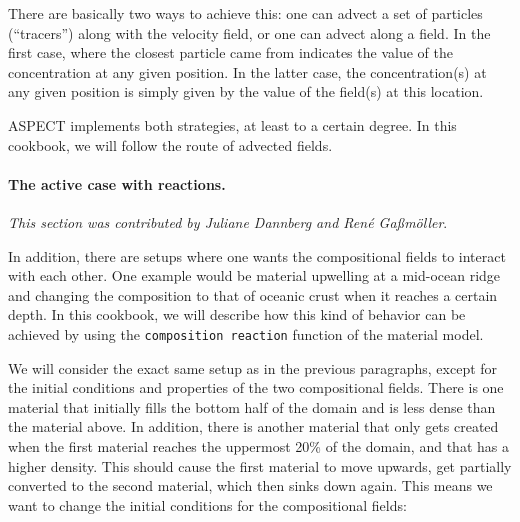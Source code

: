 \documentclass{article}
\newcommand{\aspect}{\textsc{ASPECT}}
\begin{document}
There are basically two ways to achieve this: one can advect a set of
particles (``tracers'') along with the velocity field, or one can advect along a
field. In the first case, where the closest particle came from indicates the
value of the concentration at any given position. In the latter case, the
concentration(s) at any given position is simply given by the value of the
field(s) at this location.

\aspect{} implements both strategies, at least to a certain degree. In this
cookbook, we will follow the route of advected fields.










\paragraph{The active case with reactions.}

\textit{This section was contributed by Juliane Dannberg and Ren{\'e} Ga{\ss}m{\"o}ller}.

In addition, there are setups where one wants the compositional fields to interact with each other. One example would be material upwelling at a mid-ocean ridge and changing the composition to that of oceanic crust when it reaches a certain depth. In this cookbook, we will describe how this kind of behavior can be achieved by using the \texttt{composition reaction} function of the material model.

We will consider the exact same setup as in the previous paragraphs, except for the initial conditions and properties of the two compositional fields. There is one material that initially fills the bottom half of the domain and is less dense than the material above. In addition, there is another material that only gets created when the first material reaches the uppermost 20\% of the domain, and that has a higher density. This should cause the first material to move upwards, get partially converted to the second material, which then sinks down again. This means we want to change the initial conditions for the compositional fields:


\end{document}
